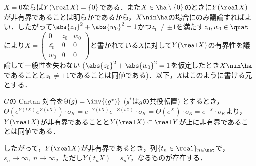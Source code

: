 \begin{npfwn}
  
  $X = 0$ならば$ Y(\real X) = \{0\} $である．また$X\in \ha\setminus\{0\} $のときに$Y(\real X) $が非有界であることは明らかであるから，$X\nin \ha $の場合にのみ議論すればよい．したがって$\abs{z_0}^2 +\abs{w_0}^2  = 1 $かつ$ z_0 \neq \pm 1 $を満たす$z_0,w_0\in \quat$により$X =  \begin{pmatrix}
    0 & z_0 & w_0 \\
    \bar{z_0} & 0 & 0 \\
    \bar{w_0} & 0 & 0 
  \end{pmatrix}$と書かれている$X$に対して$Y(\real X) $の有界性を議論して一般性を失わない ($\abs{z_0}^2 +\abs{w_0}^2  = 1 $を仮定したとき$X\nin \ha $であることと$z_0\neq \pm 1$であることは同値である)．以下，$X$はこのように書ける元とする．%

  $G$の Cartan 対合を$\Theta(g) = \inv{(g^{*})} $ ($g^{*}$は$g$の共役転置) とするとき，$\Theta(e^{Y(tX)}e^{Z(tX)})\cdot o_K = e^{-Y(tX)}e^{-Z(tX)}\cdot o_K = \Theta(e^{X})\cdot o_K = e^{-X}\cdot o_K $より，$Y(\real X) $が非有界であることと$ Y(\real X)\subset \real Y $が上に非有界であることは同値である．

  したがって，$Y (\real X) $が非有界であるとき，列$\{t_n \in \real \}_{n\in \nat} $で，$s_n\to \infty,\; n\to \infty$，ただし$Y(t_n X) = s_n Y$，なるものが存在する．


\end{npfwn}
